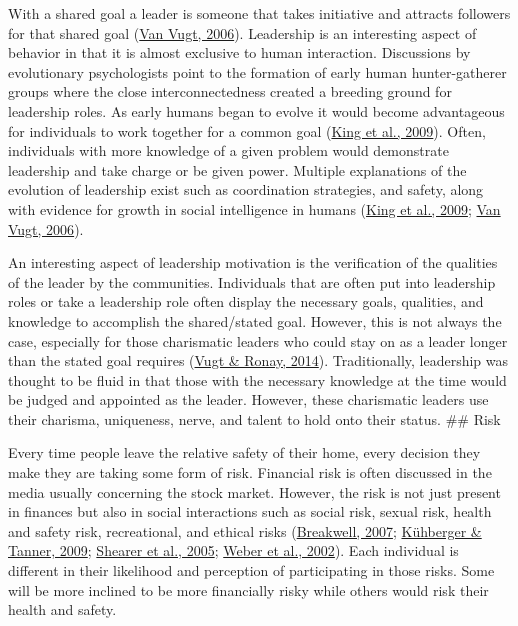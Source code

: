 \documentclass[
  donotrepeattitle,doc, 12pt, a4paper,floatsintext]{apa7}
\begin{document}
With a shared goal a leader is someone that takes initiative and attracts followers for that shared goal (\protect\hyperlink{ref-vanvugt2006}{Van Vugt, 2006}). Leadership is an interesting aspect of behavior in that it is almost exclusive to human interaction. Discussions by evolutionary psychologists point to the formation of early human hunter-gatherer groups where the close interconnectedness created a breeding ground for leadership roles. As early humans began to evolve it would become advantageous for individuals to work together for a common goal (\protect\hyperlink{ref-king2009}{King et al., 2009}). Often, individuals with more knowledge of a given problem would demonstrate leadership and take charge or be given power. Multiple explanations of the evolution of leadership exist such as coordination strategies, and safety, along with evidence for growth in social intelligence in humans (\protect\hyperlink{ref-king2009}{King et al., 2009}; \protect\hyperlink{ref-vanvugt2006}{Van Vugt, 2006}).

An interesting aspect of leadership motivation is the verification of the qualities of the leader by the communities. Individuals that are often put into leadership roles or take a leadership role often display the necessary goals, qualities, and knowledge to accomplish the shared/stated goal. However, this is not always the case, especially for those charismatic leaders who could stay on as a leader longer than the stated goal requires (\protect\hyperlink{ref-vugt2014}{Vugt \& Ronay, 2014}). Traditionally, leadership was thought to be fluid in that those with the necessary knowledge at the time would be judged and appointed as the leader. However, these charismatic leaders use their charisma, uniqueness, nerve, and talent to hold onto their status.
\#\# Risk

Every time people leave the relative safety of their home, every decision they make they are taking some form of risk. Financial risk is often discussed in the media usually concerning the stock market. However, the risk is not just present in finances but also in social interactions such as social risk, sexual risk, health and safety risk, recreational, and ethical risks (\protect\hyperlink{ref-breakwell2007}{Breakwell, 2007}; \protect\hyperlink{ref-kuhberger2009}{Kühberger \& Tanner, 2009}; \protect\hyperlink{ref-shearer2005}{Shearer et al., 2005}; \protect\hyperlink{ref-weber2002}{Weber et al., 2002}). Each individual is different in their likelihood and perception of participating in those risks. Some will be more inclined to be more financially risky while others would risk their health and safety.
\end{document}
